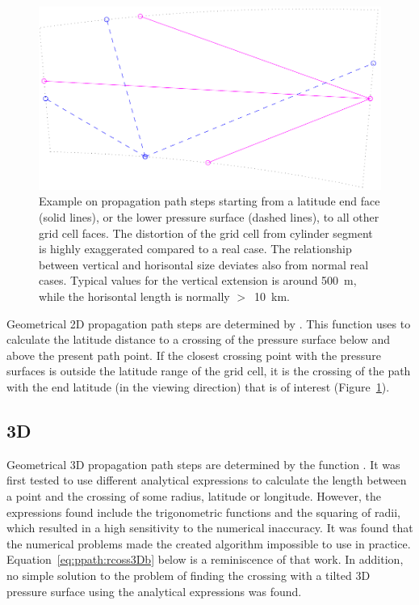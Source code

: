 \begin{figure}[!t]
 \begin{center}
  \includegraphics*[width=0.80\hsize]{Figs/ppath/ppath_ex3}
  \caption{Example on propagation path steps starting from a latitude end face 
    (solid lines), or the lower pressure surface (dashed lines), to
    all other grid cell faces. The distortion of the grid cell from
    cylinder segment is highly exaggerated compared to a real case.
    The relationship between vertical and horisontal size deviates
    also from normal real cases.  Typical values for the vertical
    extension is around 500~m, while the horisontal length is
    normally $>$~10~km.}
  \label{fig:ppath:ex3}  
 \end{center}
\end{figure}

Geometrical 2D propagation path steps are determined by
. This function uses
 to calculate the latitude distance
to a crossing of the pressure surface below and above the present path
point. If the closest crossing point with the pressure surfaces is
outside the latitude range of the grid cell, it is the crossing of the
path with the end latitude (in the viewing direction) that is of
interest (Figure~\ref{fig:ppath:ex3}).



\subsection{3D}
\label{sec:ppath:3Dgeom}

Geometrical 3D propagation path steps are determined by the function
. It was first tested to use different
analytical expressions to calculate the length between a point and
the crossing of some radius, latitude or longitude. However, the
expressions found include the trigonometric functions and the squaring
of radii, which resulted in a high sensitivity to the numerical
inaccuracy. It was found that the numerical problems made the created
algorithm impossible to use in practice.
Equation~\ref{eq:ppath:rcoss3Db} below is a reminiscence of that work.
In addition, no simple solution to the problem of finding the crossing
with a tilted 3D pressure surface using the analytical expressions was
found.

